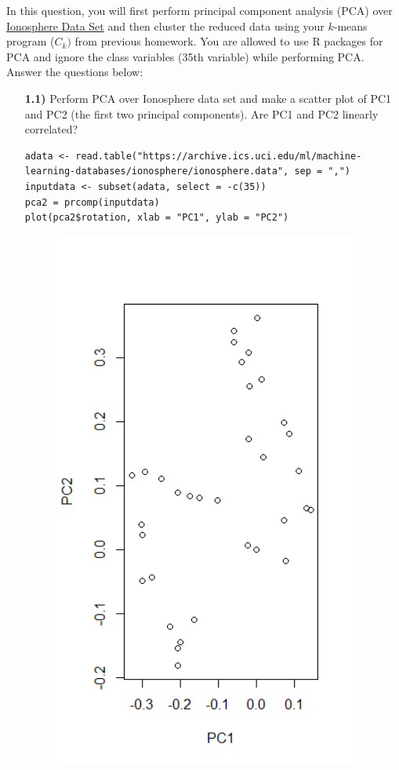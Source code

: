 \documentclass{article}
\begin{document}
In this question, you will first perform principal component analysis (PCA) over  \href{https://archive.ics.uci.edu/ml/datasets/ionosphere}{
Ionosphere Data Set} and then cluster the  reduced data using your $k$-means program ($C_k)$ from previous homework. You are allowed to use R packages for PCA and ignore the class variables (35th variable) while performing PCA. Answer the questions below:
 \\
  \begin{enumerate}
  \item[\textbf{1.1)}] Perform PCA over Ionosphere data set and make a scatter plot of PC1 and PC2 (the first two principal components). Are PC1 and PC2 linearly correlated?  
\\
\begin{lstlisting}
adata <- read.table("https://archive.ics.uci.edu/ml/machine-learning-databases/ionosphere/ionosphere.data", sep = ",")
inputdata <- subset(adata, select = -c(35))
pca2 = prcomp(inputdata)
plot(pca2$rotation, xlab = "PC1", ylab = "PC2")
\end{lstlisting} 	
\begin{figure}
  \includegraphics[width=100mm, scale = 0.5]{PC12.png}

\end{figure}
\end{enumerate}
\end{document}
